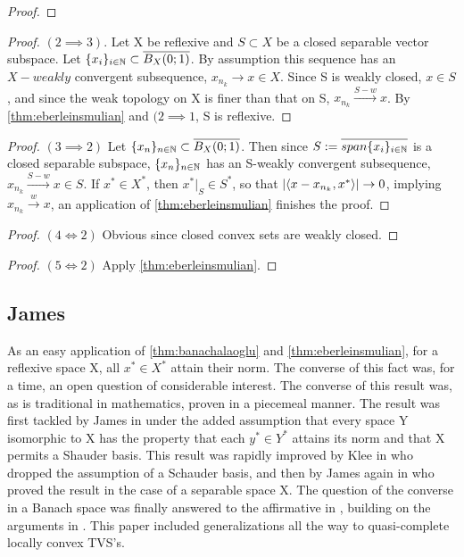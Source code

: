 \begin{lem}
\begin{proof}
    \end{proof}
    \begin{proof} $(2 \implies 3)$. 
        Let X be reflexive and $S \subset X$ be a closed separable vector subspace. Let $\{x_i\}_{i \in \mathbb{N}} \subset \overline{B_X(0;1)}$. By assumption this sequence has an $X-weakly$ convergent subsequence, $x_{n_k} \to x \in X$. Since S is weakly closed, $x \in S$, and since the weak topology on X is finer than that on S, $x_{n_k} \overset{S-w}{\to} x$. By \ref{thm:eberleinsmulian} and $(2 \implies 1$, S is reflexive.  
    \end{proof} 
    \begin{proof} $(3 \implies 2)$
        Let $\{x_n\}_{n \in \mathbb{N}} \subset \overline{B_X(0;1)}$. Then since $S:=\overline{span\{x_i\}_{i \in \mathbb{N}}}$ is a closed separable subspace, $\{x_n\}_{n \in \mathbb{N}}$ has an S-weakly convergent subsequence, $x_{n_k} \overset{S-w}{\to} x \in S$.  
        If $x^* \in X^*$, then $x^*|_{S} \in S^*$, so that $\left| \left\langle x-x_{n_k},x^* \right\rangle \right| \to 0$, implying $x_{n_k} \overset{w}{\to} x$, an application of \ref{thm:eberleinsmulian} finishes the proof. 
    \end{proof} 
    \begin{proof} $(4 \iff 2)$
        Obvious since closed convex sets are weakly closed. 
    \end{proof} 
    \begin{proof} $(5 \iff 2)$ 
        Apply \ref{thm:eberleinsmulian}.
    \end{proof} 
\end{lem} 

\subsection{James}
As an easy application of \ref{thm:banachalaoglu} and \ref{thm:eberleinsmulian}, for a reflexive space X, all $x^* \in X^*$ attain their norm.  The converse of this fact was, for a time, an open question of considerable interest. The converse of this result was, as is traditional in mathematics, proven in a piecemeal manner. The result was first tackled by James in \cite{james50} under the added assumption that every space Y isomorphic to X has the property that each $y^* \in Y^*$ attains its norm and that X permits a Shauder basis. This result was rapidly improved by Klee in \cite{klee50} who dropped the assumption of a Schauder basis, and then by James again in \cite{james57} who proved the result in the case of a separable space X. The question of the converse in a Banach space was finally answered to the affirmative in \cite{james64reflexivity}, building on the arguments in \cite{james57}. This paper included generalizations all the way to quasi-complete locally convex TVS's. 

